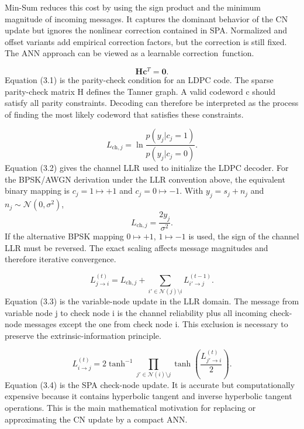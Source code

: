Min-Sum reduces this cost by using the sign product and the minimum magnitude of incoming messages. It captures the dominant behavior of the CN update but ignores the nonlinear correction contained in SPA. Normalized and offset variants add empirical correction factors, but the correction is still fixed. The ANN approach can be viewed as a learnable correction~function.

\begin{equation}
\mathbf{H}\mathbf{c}^{T}=\mathbf{0}.
\end{equation}
Equation (3.1) is the parity-check condition for an LDPC code. The sparse parity-check matrix H defines the Tanner graph. A valid codeword c should satisfy all parity constraints. Decoding can therefore be interpreted as the process of finding the most likely codeword that satisfies these constraints.

\begin{equation}
L_{\mathrm{ch},j}=\ln\frac{p(y_j|c_j=1)}{p(y_j|c_j=0)}.
\end{equation}
Equation (3.2) gives the channel LLR used to initialize the LDPC decoder. For the BPSK/AWGN derivation under the LLR convention above, the equivalent binary mapping is $c_j=1\mapsto +1$ and $c_j=0\mapsto -1$. With $y_j=s_j+n_j$ and $n_j\sim\mathcal{N}(0,\sigma^2)$,
\begin{equation*}
L_{\mathrm{ch},j}=\frac{2y_j}{\sigma^2}.
\end{equation*}
If the alternative BPSK mapping $0\mapsto +1$, $1\mapsto -1$ is used, the sign of the channel LLR must be reversed. The exact scaling affects message magnitudes and therefore iterative convergence.

\begin{equation}
L_{j\rightarrow i}^{(t)}=L_{\mathrm{ch},j}+\sum_{i'\in\mathcal{N}(j)\setminus i}L_{i'\rightarrow j}^{(t-1)}.
\end{equation}
Equation (3.3) is the variable-node update in the LLR domain. The message from variable node j to check node i is the channel reliability plus all incoming check-node messages except the one from check node i. This exclusion is necessary to preserve the extrinsic-information principle.

\begin{equation}
L_{i\rightarrow j}^{(t)}=
2\tanh^{-1}\!\prod_{j'\in\mathcal{N}(i)\setminus j}\tanh\!\left(\frac{L_{j'\rightarrow i}^{(t)}}{2}\right).
\end{equation}
Equation (3.4) is the SPA check-node update. It is accurate but computationally expensive because it contains hyperbolic tangent and inverse hyperbolic tangent operations. This is the main mathematical motivation for replacing or approximating the CN update by a compact ANN.

